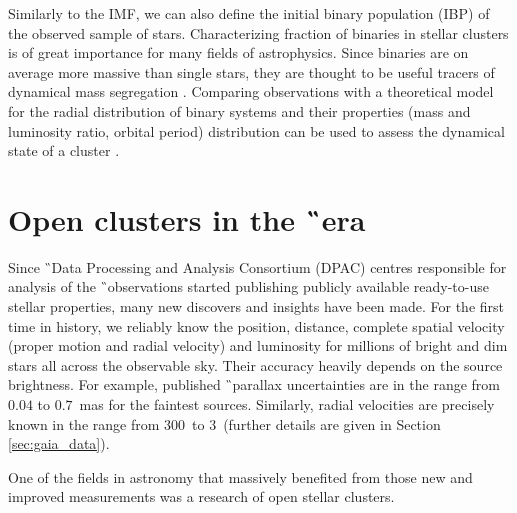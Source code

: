 Similarly to the IMF, we can also define the initial binary population (IBP) of the observed sample of stars. Characterizing fraction of binaries in stellar clusters is of great importance for many fields of astrophysics. Since binaries are on average more massive than single stars, they are thought to be useful tracers of dynamical mass segregation \cite{2015arXiv151000099D}. Comparing observations with a theoretical model for the radial distribution of binary systems and their properties (mass and luminosity ratio, orbital period) distribution can be used to assess the dynamical state of a cluster \cite{1999NewA....4..495K}.

\section{Open clusters in the \G\ era}
\label{sec:open_clust_gaia}
Since \G\ Data Processing and Analysis Consortium (DPAC) centres responsible for analysis of the \G\ observations started publishing publicly available ready-to-use stellar properties, many new discovers and insights have been made. For the first time in history, we reliably know the position, distance, complete spatial velocity (proper motion and radial velocity) and luminosity for millions of bright and dim stars all across the observable sky. Their accuracy heavily depends on the source brightness. For example, published \G\ parallax uncertainties are in the range from $0.04$ to $0.7$~mas for the faintest sources. Similarly, radial velocities are precisely known in the range from 300~\ms to 3~\kms (further details are given in Section \ref{sec:gaia_data}).

One of the fields in astronomy that massively benefited from those new and improved measurements was a research of open stellar clusters.

